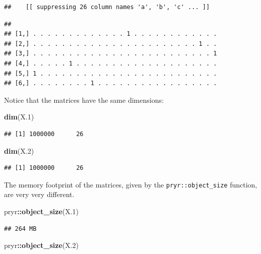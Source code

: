\documentclass[]{book}
\newenvironment{Shaded}{\begin{snugshade}}{\end{snugshade}}
\newcommand{\KeywordTok}[1]{\textcolor[rgb]{0.13,0.29,0.53}{\textbf{#1}}}
\newcommand{\DecValTok}[1]{\textcolor[rgb]{0.00,0.00,0.81}{#1}}
\newcommand{\OperatorTok}[1]{\textcolor[rgb]{0.81,0.36,0.00}{\textbf{#1}}}
\newcommand{\NormalTok}[1]{#1}
\theoremstyle{definition}
\theoremstyle{definition}
\theoremstyle{definition}
\theoremstyle{remark}
\begin{document}
\begin{verbatim}
##    [[ suppressing 26 column names 'a', 'b', 'c' ... ]]
\end{verbatim}

\begin{verbatim}
##                                                         
## [1,] . . . . . . . . . . . . . 1 . . . . . . . . . . . .
## [2,] . . . . . . . . . . . . . . . . . . . . . . . 1 . .
## [3,] . . . . . . . . . . . . . . . . . . . . . . . . . 1
## [4,] . . . . . 1 . . . . . . . . . . . . . . . . . . . .
## [5,] 1 . . . . . . . . . . . . . . . . . . . . . . . . .
## [6,] . . . . . . . . 1 . . . . . . . . . . . . . . . . .
\end{verbatim}

Notice that the matrices have the same dimensions:

\begin{Shaded}
\begin{Highlighting}[]
\KeywordTok{dim}\NormalTok{(X.}\DecValTok{1}\NormalTok{)}
\end{Highlighting}
\end{Shaded}

\begin{verbatim}
## [1] 1000000      26
\end{verbatim}

\begin{Shaded}
\begin{Highlighting}[]
\KeywordTok{dim}\NormalTok{(X.}\DecValTok{2}\NormalTok{)}
\end{Highlighting}
\end{Shaded}

\begin{verbatim}
## [1] 1000000      26
\end{verbatim}

The memory footprint of the matrices, given by the
\texttt{pryr::object\_size} function, are very very different.

\begin{Shaded}
\begin{Highlighting}[]
\NormalTok{pryr}\OperatorTok{::}\KeywordTok{object_size}\NormalTok{(X.}\DecValTok{1}\NormalTok{)}
\end{Highlighting}
\end{Shaded}

\begin{verbatim}
## 264 MB
\end{verbatim}

\begin{Shaded}
\begin{Highlighting}[]
\NormalTok{pryr}\OperatorTok{::}\KeywordTok{object_size}\NormalTok{(X.}\DecValTok{2}\NormalTok{)}
\end{Highlighting}
\end{Shaded}
\end{document}
